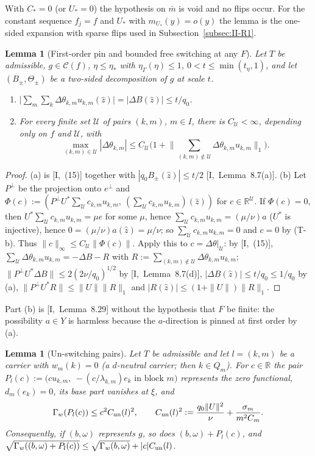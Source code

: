 \documentclass[10pt]{amsart}
\newtheorem{lemma}[theorem]{Lemma}
\theoremstyle{definition}
\theoremstyle{remark}
\newcommand{\R}{\mathbb R}
\newcommand{\Cset}{\mathcal C}
\newcommand{\zh}{\hat z}
\begin{document}
With $C_*=0$ (or $U_*=0$) the hypothesis on $\bar m$ is void and no flips
occur.  For the constant sequence $f_j=f$ and $U_*$ with $m_{U_*}(y)=o(y)$
the lemma is the one-sided expansion with sparse flips used in
Subsection~\ref{subsec:II-R1}.

\begin{lemma}[First-order pin and bounded free switching at any $F$]
\label{lem:II-boundedfree}
Let $T$ be admissible, $g\in\Cset(f)$, $\eta\le\eta_*$ with
$\eta_\Gamma(\eta)\le1$, $0<t\le\min(t_\eta,1)$, and let $(B_\pm,\Theta_\pm)$
be a two-sided decomposition of $g$ at scale $t$.
\begin{enumerate}
\item[(a)] $\big|\sum_{m}\sum_k\Delta\theta_{k,m}u_{k,m}(\zh)\big|=
|\Delta B(\zh)|\le t/q_0$.
\item[(b)] For every finite set $\mathcal U$ of pairs $(k,m)$, $m\in I$,
there is $C_{\mathcal U}<\infty$, depending only on $f$ and $\mathcal U$,
with
\[
 \max_{(k,m)\in\mathcal U}|\Delta\theta_{k,m}|\le C_{\mathcal U}\Big(1+
 \Big\|\sum_{(k,m)\notin\mathcal U}\Delta\theta_{k,m}u_{k,m}\Big\|_1\Big).
\]
\end{enumerate}
\end{lemma}

\begin{proof}
(a) is [I,~(15)] together with $|q_0B_\pm(\zh)|\le t/2$
[I,~Lemma~8.7(a)].  (b) Let $P^\perp$ be the projection onto $e^\perp$ and
$\Phi(c):=(P^\perp U^*\sum_{\mathcal U}c_{k,m}u_{k,m},\ (\sum_{\mathcal U}
c_{k,m}u_{k,m})(\zh))$ for $c\in\R^{\mathcal U}$.  If $\Phi(c)=0$, then
$U^*\sum_{\mathcal U}c_{k,m}u_{k,m}=\mu e$ for some $\mu$, hence
$\sum_{\mathcal U}c_{k,m}u_{k,m}=(\mu/\nu)a$ ($U^*$ is injective), hence
$0=(\mu/\nu)a(\zh)=\mu/\nu$; so $\sum_{\mathcal U}c_{k,m}u_{k,m}=0$ and $c=0$
by (T-b).  Thus $\|c\|_\infty\le C_{\mathcal U}\|\Phi(c)\|$.  Apply this to
$c=\Delta\theta|_{\mathcal U}$: by [I,~(15)], $\sum_{\mathcal U}\Delta\theta
_{k,m}u_{k,m}=-\Delta B-R$ with $R:=\sum_{(k,m)\notin\mathcal U}\Delta\theta
_{k,m}u_{k,m}$; $\|P^\perp U^*\Delta B\|\le2(2\nu/q_0)^{1/2}$ by
[I,~Lemma~8.7(d)], $|\Delta B(\zh)|\le t/q_0\le1/q_0$ by (a),
$\|P^\perp U^*R\|\le\|U\|\|R\|_1$ and $|R(\zh)|\le(1+\|U\|)\|R\|_1$.
\end{proof}

Part (b) is [I,~Lemma~8.29] without the hypothesis that $F$ be finite:
the possibility $a\in Y$ is harmless because the $a$-direction is pinned at
first order by (a).

\begin{lemma}[Un-switching pairs]\label{lem:II-unswitch}
Let $T$ be admissible and let $l=(k,m)$ be a carrier with $w_m(k)=0$ (a
\emph{$d$-neutral} carrier; then $k\in Q_m$).  For $c\in\R$ the pair
$P_l(c):=\big(cu_{k,m},\ -(c/\lambda_{k,m})e_k\text{ in block }m\big)$
represents the zero functional, $d_m(e_k)=0$, its base part vanishes at
$\xi$, and
\[
 \Gamma_w(P_l(c))\le c^2C_{\rm un}(l)^2,\qquad C_{\rm un}(l)^2:=
 \frac{q_0\|U\|^2}\nu+\frac{\sigma_m}{m^2C_m}.
\]
Consequently, if $(b,\omega)$ represents $g$, so does $(b,\omega)+P_l(c)$,
and $\sqrt{\Gamma_w((b,\omega)+P_l(c))}\le\sqrt{\Gamma_w(b,\omega)}+|c|
C_{\rm un}(l)$.
\end{lemma}
\end{document}
